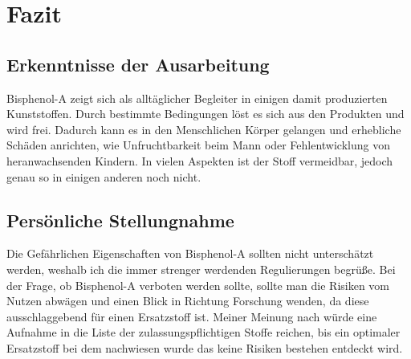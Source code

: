 \section{Fazit}
\subsection{Erkenntnisse der Ausarbeitung}
Bisphenol-A zeigt sich als alltäglicher Begleiter in einigen damit produzierten Kunststoffen. Durch bestimmte Bedingungen löst es sich aus den Produkten und wird frei. Dadurch kann es in den Menschlichen Körper gelangen und erhebliche Schäden anrichten, wie Unfruchtbarkeit beim Mann oder Fehlentwicklung von heranwachsenden Kindern. In vielen Aspekten ist der Stoff vermeidbar, jedoch genau so in einigen anderen noch nicht.
\subsection{Persönliche Stellungnahme}
Die Gefährlichen Eigenschaften von Bisphenol-A sollten nicht unterschätzt werden, weshalb ich die immer strenger werdenden Regulierungen begrüße. Bei der Frage, ob Bisphenol-A verboten werden sollte, sollte man die Risiken vom Nutzen abwägen und einen Blick in Richtung Forschung wenden, da diese ausschlaggebend für einen Ersatzstoff ist. Meiner Meinung nach würde eine Aufnahme in die Liste der zulassungspflichtigen Stoffe reichen, bis ein optimaler Ersatzstoff bei dem nachwiesen wurde das keine Risiken bestehen entdeckt wird.
